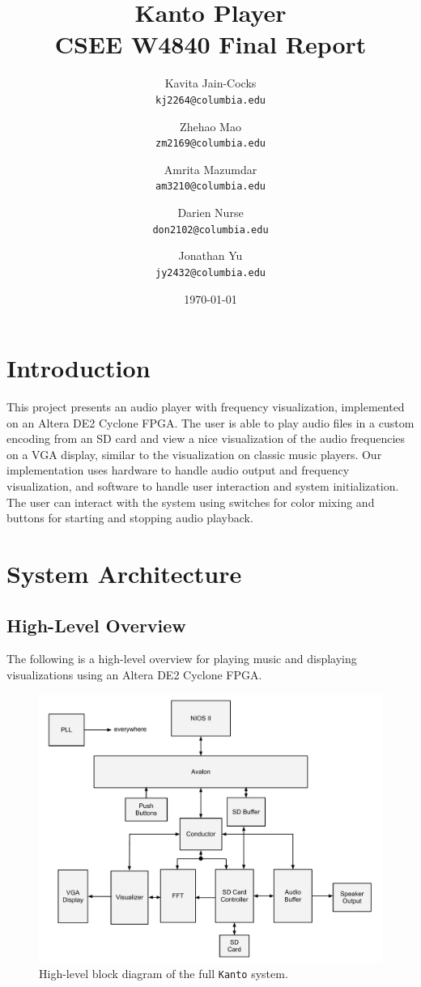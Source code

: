 \documentclass{article}
\title{Kanto Player \\
CSEE W4840 Final Report}
\author{
  Kavita Jain-Cocks\\
  \texttt{kj2264@columbia.edu}
  \and
  Zhehao Mao\\
  \texttt{zm2169@columbia.edu}
  \and
  Amrita Mazumdar\\
  \texttt{am3210@columbia.edu}
  \and
  Darien Nurse\\
  \texttt{don2102@columbia.edu}
  \and
  Jonathan Yu\\
  \texttt{jy2432@columbia.edu}
   \\}
\date{\today}
\begin{document}
\maketitle
\newpage

\section{Introduction}
This project presents an audio player with frequency visualization, implemented
on an Altera DE2 Cyclone FPGA. The user is able to play audio files in a custom
encoding from an SD card and view a nice visualization of the audio frequencies
on a VGA display, similar to the visualization on classic music players. Our
implementation uses hardware to handle audio output and frequency
visualization, and software to handle user interaction and system
initialization. The user can interact with the system using switches for color
mixing and buttons for starting and stopping audio playback.

\section{System Architecture}

\subsection{High-Level Overview}

The following is a high-level overview for playing music and displaying 
visualizations using an Altera DE2 Cyclone FPGA.

\begin{figure}[H]
	\centering
	\includegraphics[scale=0.45]{top_level}
	\caption{High-level block diagram of the full \texttt{Kanto} system.}
\end{figure}
\end{document}

